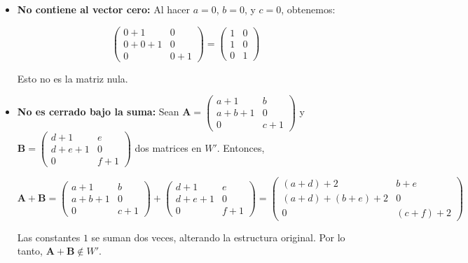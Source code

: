 \documentclass{article}
\begin{document}
\begin{itemize}
    \item \textbf{No contiene al vector cero:} Al hacer \(a = 0\), \(b = 0\), y \(c = 0\), obtenemos:

    \[
    \begin{pmatrix}
    0+1 & 0 \\
    0+0+1 & 0 \\ 
    0 & 0+1 
    \end{pmatrix} =
    \begin{pmatrix}
    1 & 0 \\
    1 & 0 \\
    0 & 1
    \end{pmatrix}
    \]

    Esto no es la matriz nula.

    \item \textbf{No es cerrado bajo la suma:} Sean \(\mathbf{A} = \begin{pmatrix} a+1 & b \\ a+b+1 & 0 \\ 0 & c+1 \end{pmatrix}\) y \(\mathbf{B} = \begin{pmatrix} d+1 & e \\ d+e+1 & 0 \\ 0 & f+1 \end{pmatrix}\) dos matrices en \(W'\). Entonces,

    \[
    \mathbf{A} + \mathbf{B} = \begin{pmatrix} a+1 & b \\ a+b+1 & 0 \\ 0 & c+1 \end{pmatrix} + \begin{pmatrix} d+1 & e \\ d+e+1 & 0 \\ 0 & f+1 \end{pmatrix} = \begin{pmatrix} (a+d)+2 & b+e \\ (a+d)+(b+e)+2 & 0 \\ 0 & (c+f)+2 \end{pmatrix}
    \]

    Las constantes \(1\) se suman dos veces, alterando la estructura original. Por lo tanto, \(\mathbf{A} + \mathbf{B} \notin W'\).
\end{itemize}
\end{document}
